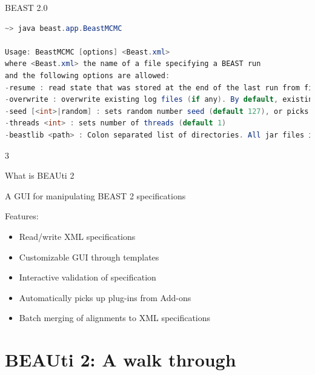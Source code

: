 \documentclass{beamer}
\def\part{1}
\theoremstyle{definition}
\begin{document}
\begin{frame}[containsverbatim]
{BEAST 2.0}

\begin{lstlisting}[language=java]
~> java beast.app.BeastMCMC

Usage: BeastMCMC [options] <Beast.xml>
where <Beast.xml> the name of a file specifying a BEAST run
and the following options are allowed:
-resume : read state that was stored at the end of the last run from file and append log file
-overwrite : overwrite existing log files (if any). By default, existing files will not be overwritten.
-seed [<int>|random] : sets random number seed (default 127), or picks a random seed
-threads <int> : sets number of threads (default 1)
-beastlib <path> : Colon separated list of directories. All jar files in the path are loaded. (default 'beastlib')
\end{lstlisting}
\end{frame}

\fi



\if \part 3

\begin{frame}[containsverbatim]{What is BEAUti 2}

A GUI for manipulating BEAST 2 specifications\vskip0.5cm

Features:
\begin{itemize}
\item Read/write XML specifications
\item Customizable GUI through templates
\item Interactive validation of specification
\item Automatically picks up plug-ins from Add-ons
\item Batch merging of alignments to XML specifications
\end{itemize}
\end{frame}


\section{BEAUti 2: A walk through}
\end{document}
